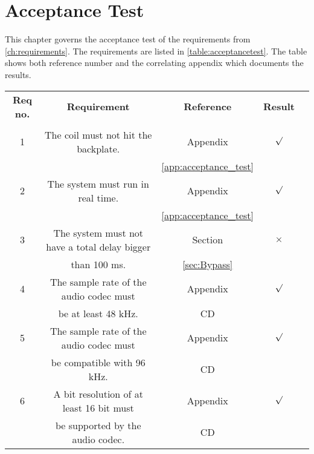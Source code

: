 \chapter{Acceptance Test}

This chapter governs the acceptance test of the requirements from \autoref{ch:requirements}. The requirements are listed in \autoref{table:acceptancetest}. The table shows both reference number and the correlating appendix which documents the results.  

\renewcommand{\arraystretch}{0.95}
\begin{table}[H]
\centering
\begin{tabular}{|c|c|c|c|c|} \hline
\rowcolor{lightgray} \bfseries Req no. 	& \bfseries Requirement 						&  \bfseries Reference				&\bfseries Result 	\\ 
\rowcolor{lightgray}					&												&  									&		 			\\ \hline

1			& The coil must not hit the backplate. 			& Appendix 								&	$\surd$ 		\\ 
 			&												& \ref{app:acceptance_test}				&	 				\\ \hline
%
2			& The system must run in real time.	 			& Appendix								& 	$\surd$			\\ 
			& 												& \ref{app:acceptance_test}				&					\\ \hline
%
3			& The system must not have a total delay bigger & Section								&  $\times$			\\ 
			& than 100 ms.			 						& \ref{sec:Bypass}						&					\\ \hline
%
4			& The sample rate of the audio codec must   	& Appendix								& 	$\surd$			\\ 
			& be at least 48 kHz.							&	CD									&					\\ \hline

5			& The sample rate of the audio codec must   	& Appendix								& 	$\surd$			\\ 
			& be compatible with 96 kHz.					&	CD									&					\\ \hline
6			&  A bit resolution of at least 16 bit must 	& Appendix								&	$\surd$			\\ 
			&  be supported by the audio codec. 	 	 	&	CD					 				&					\\ \hline


\end{tabular}
\end{table}
